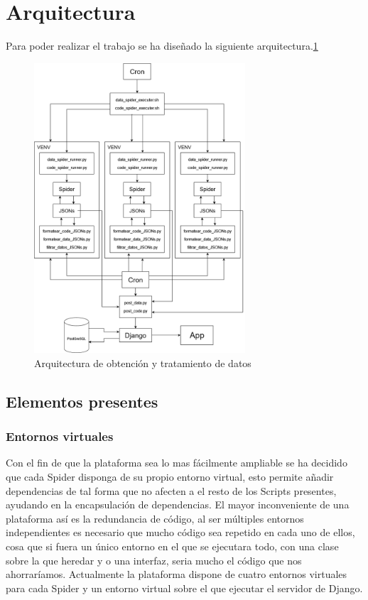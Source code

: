 \section{Arquitectura}
Para poder realizar el trabajo se ha diseñado la siguiente arquitectura.\ref{fig:ej7}
\begin{figure} [h]
	\centering
	\includegraphics[width=0.7\textwidth]{fig/arquitectura.png}
	\caption[Arquitectura de obtención y tratamiento de datos]{Arquitectura de obtención y tratamiento de datos}
	\label{fig:ej7}
\end{figure}

\subsection{Elementos presentes}

\subsubsection{Entornos virtuales}
Con el fin de que la plataforma sea lo mas fácilmente ampliable se ha decidido que cada Spider disponga de su propio entorno virtual, esto permite añadir dependencias de tal forma que no afecten a el resto de los Scripts presentes, ayudando en la encapsulación de dependencias.\newline
\newline
El mayor inconveniente de una plataforma así es la redundancia de código, al ser múltiples entornos independientes es necesario que mucho código sea repetido en cada uno de ellos, cosa que si fuera un único entorno en el que se ejecutara todo, con una clase sobre la que heredar y o una interfaz, seria mucho el código que nos ahorraríamos.\newline
\newline
Actualmente la plataforma dispone de cuatro entornos virtuales para cada Spider y un entorno virtual sobre el que ejecutar el servidor de Django.

